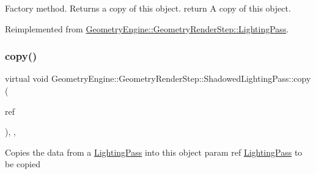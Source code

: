 Factory method. Returns a copy of this object. return A copy of this object. 

Reimplemented from \mbox{\hyperlink{class_geometry_engine_1_1_geometry_render_step_1_1_lighting_pass_a4f1cb36c7bf6a90d0aa3b8e8feba5e5e}{Geometry\+Engine\+::\+Geometry\+Render\+Step\+::\+Lighting\+Pass}}.

\mbox{\label{class_geometry_engine_1_1_geometry_render_step_1_1_shadowed_lighting_pass_add7b889c49a68911f675ee44ab656699}} 
\subsubsection{\texorpdfstring{copy()}{copy()}}
{\footnotesize\ttfamily virtual void Geometry\+Engine\+::\+Geometry\+Render\+Step\+::\+Shadowed\+Lighting\+Pass\+::copy (\begin{DoxyParamCaption}\item[{const \mbox{\hyperlink{class_geometry_engine_1_1_geometry_render_step_1_1_shadowed_lighting_pass}{Shadowed\+Lighting\+Pass}} \&}]{ref }\end{DoxyParamCaption})\hspace{0.3cm}{\ttfamily [inline]}, {\ttfamily [protected]}, {\ttfamily [virtual]}}

Copies the data from a \mbox{\hyperlink{class_geometry_engine_1_1_geometry_render_step_1_1_lighting_pass}{Lighting\+Pass}} into this object param ref \mbox{\hyperlink{class_geometry_engine_1_1_geometry_render_step_1_1_lighting_pass}{Lighting\+Pass}} to be copied \mbox{\label{class_geometry_engine_1_1_geometry_render_step_1_1_shadowed_lighting_pass_af52807435083cd96125e6ef6d7453027}} 
